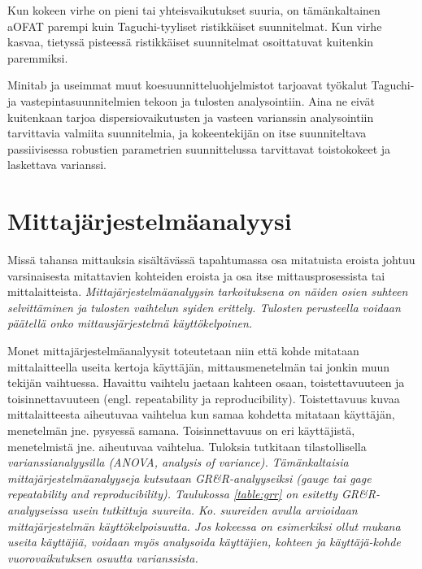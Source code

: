 \documentclass[12pt,a4paper,finnish]{tutthesis}
\begin{document}
Kun kokeen virhe on pieni
tai yhteisvaikutukset suuria, on
tämänkaltainen aOFAT parempi kuin Taguchi-tyyliset ristikkäiset suunnitelmat.
Kun virhe kasvaa, tietyssä pisteessä ristikkäiset suunnitelmat osoittatuvat
kuitenkin paremmiksi.


Minitab ja useimmat muut koesuunnitteluohjelmistot tarjoavat työkalut
Taguchi- ja vastepintasuunnitelmien tekoon ja tulosten analysointiin.
Aina ne eivät kuitenkaan tarjoa dispersiovaikutusten ja vasteen varianssin
analysointiin tarvittavia valmiita suunnitelmia, ja kokeentekijän
on itse suunniteltava passiivisessa robustien parametrien suunnittelussa
tarvittavat toistokokeet ja laskettava varianssi.



\chapter{Mittajärjestelmäanalyysi}
\label{ch:grr}


Missä tahansa mittauksia sisältävässä tapahtumassa osa mitatuista
eroista johtuu varsinaisesta mitattavien kohteiden eroista ja osa itse mittausprosessista
tai mittalaitteista. \em Mittajärjestelmäanalyysin \em tarkoituksena
on näiden osien suhteen selvittäminen ja tulosten vaihtelun syiden erittely.
Tulosten perusteella voidaan päätellä onko mittausjärjestelmä käyttökelpoinen.



Monet mittajärjestelmäanalyysit toteutetaan niin että kohde mitataan
mittalaitteella useita kertoja käyttäjän, mittausmenetelmän tai jonkin muun
tekijän vaihtuessa. Havaittu vaihtelu jaetaan kahteen osaan, toistettavuuteen
ja toisinnettavuuteen (engl. repeatability ja reproducibility). Toistettavuus
kuvaa mittalaitteesta aiheutuvaa vaihtelua kun samaa
kohdetta mitataan käyttäjän, menetelmän jne. pysyessä samana. Toisinnettavuus
on eri käyttäjistä, menetelmistä jne. aiheutuvaa vaihtelua.
Tuloksia tutkitaan tilastollisella \em varianssianalyysilla \em (ANOVA, analysis of variance).
Tämänkaltaisia mittajärjestelmäanalyyseja kutsutaan GR\&R-analyyseiksi
(gauge tai gage repeatability and reproducibility).
Taulukossa \ref{table:grr} on esitetty GR\&R-analyyseissa usein tutkittuja
suureita. Ko. suureiden avulla arvioidaan mittajärjestelmän käyttökelpoisuutta.
Jos kokeessa on esimerkiksi ollut mukana useita käyttäjiä, voidaan myös
analysoida käyttäjien, kohteen ja käyttäjä-kohde vuorovaikutuksen osuutta
varianssista.
\end{document}
